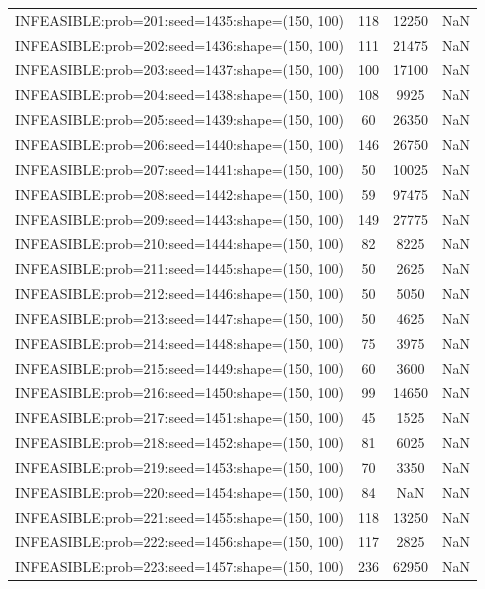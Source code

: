 \begin{longtable}{lccc}
INFEASIBLE:prob=201:seed=1435:shape=(150, 100) &   118 & 12250 &    NaN \\
INFEASIBLE:prob=202:seed=1436:shape=(150, 100) &   111 & 21475 &    NaN \\
INFEASIBLE:prob=203:seed=1437:shape=(150, 100) &   100 & 17100 &    NaN \\
INFEASIBLE:prob=204:seed=1438:shape=(150, 100) &   108 &  9925 &    NaN \\
INFEASIBLE:prob=205:seed=1439:shape=(150, 100) &    60 & 26350 &    NaN \\
INFEASIBLE:prob=206:seed=1440:shape=(150, 100) &   146 & 26750 &    NaN \\
INFEASIBLE:prob=207:seed=1441:shape=(150, 100) &    50 & 10025 &    NaN \\
INFEASIBLE:prob=208:seed=1442:shape=(150, 100) &    59 & 97475 &    NaN \\
INFEASIBLE:prob=209:seed=1443:shape=(150, 100) &   149 & 27775 &    NaN \\
INFEASIBLE:prob=210:seed=1444:shape=(150, 100) &    82 &  8225 &    NaN \\
INFEASIBLE:prob=211:seed=1445:shape=(150, 100) &    50 &  2625 &    NaN \\
INFEASIBLE:prob=212:seed=1446:shape=(150, 100) &    50 &  5050 &    NaN \\
INFEASIBLE:prob=213:seed=1447:shape=(150, 100) &    50 &  4625 &    NaN \\
INFEASIBLE:prob=214:seed=1448:shape=(150, 100) &    75 &  3975 &    NaN \\
INFEASIBLE:prob=215:seed=1449:shape=(150, 100) &    60 &  3600 &    NaN \\
INFEASIBLE:prob=216:seed=1450:shape=(150, 100) &    99 & 14650 &    NaN \\
INFEASIBLE:prob=217:seed=1451:shape=(150, 100) &    45 &  1525 &    NaN \\
INFEASIBLE:prob=218:seed=1452:shape=(150, 100) &    81 &  6025 &    NaN \\
INFEASIBLE:prob=219:seed=1453:shape=(150, 100) &    70 &  3350 &    NaN \\
INFEASIBLE:prob=220:seed=1454:shape=(150, 100) &    84 &   NaN &    NaN \\
INFEASIBLE:prob=221:seed=1455:shape=(150, 100) &   118 & 13250 &    NaN \\
INFEASIBLE:prob=222:seed=1456:shape=(150, 100) &   117 &  2825 &    NaN \\
INFEASIBLE:prob=223:seed=1457:shape=(150, 100) &   236 & 62950 &    NaN \\

\end{longtable}

